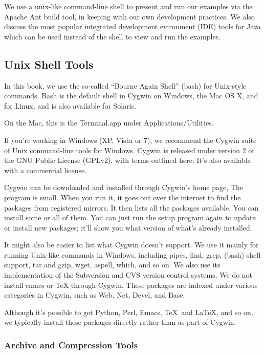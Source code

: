 We use a unix-like command-line shell to present and run our examples
via the Apache Ant build tool, in keeping with our own development
practices.  We also discuss the most popular integrated
development evironment (IDE) tools for Java which can be used
instead of the shell to view and run the examples.

\subsection{Unix Shell Tools}

In this book, we use the so-called ``Bourne Again Shell'' (bash) for
Unix-style commands.  Bash is the default shell in Cygwin on Windows,
the Mac OS X, and for Linux, and is also available for Solaris.

On the Mac, this is the Terminal.app under Applications/Utilities.

If you're working in Windows (XP, Vista or 7), we recommend the 
Cygwin suite of Unix command-line tools for Windows.  
Cygwin is released under version 2 of the GNU Public License (GPLv2), with
terms outlined here:
%
%
It's also available with a commercial license.

Cygwin can be downloaded and installed through Cygwin's home page,
%
%
The  program is small.  When you run it, it goes out
over the internet to find the packages from registered mirrors.  It
then lists all the packages available.  You can install some or all of
them.  You can just run the setup program again to update or install
new packages; it'll show you what version of what's already installed.

It might also be easier to list what Cygwin doesn't support.  We use
it mainly for running Unix-like commands in Windows, including pipes,
find, grep, (bash) shell support, tar and gzip, wget, aspell, which,
and so on.  We also use its implementation of the Subversion and CVS
version control systems.  We do not install emacs or TeX through
Cygwin.  These packages are indexed under various categories in
Cygwin, such as Web, Net, Devel, and Base.  

Although it's possible to get Python, Perl, Emacs, \TeX\ and \LaTeX,
and so on, we typically install these packages directly rather than
as part of Cygwin.


\subsubsection{Archive and Compression Tools}

